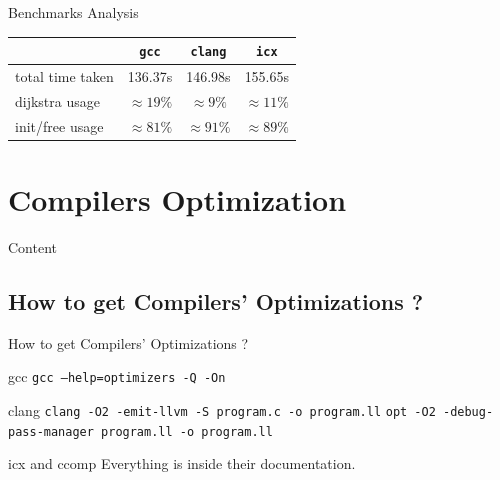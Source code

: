 \documentclass{beamer}
\newcommand{\gcc}{\texttt{gcc} }
\newcommand{\icx}{\texttt{icx} }
\newcommand{\clang}{\texttt{clang} }
\begin{document}
    \begin{frame}{Benchmarks Analysis}
        \begin{block}{}
            \begin{table}[H]
            \centering
            \begin{tabular}{|l|c|c|c|}
            \hline
            & \gcc & \clang & \icx \\
            \hline
            total time taken & 136.37s       & 146.98s       & 155.65s \\
            dijkstra usage   & $\approx19\%$ & $\approx9\%$  & $\approx11\%$    \\
            init/free usage  & $\approx81\%$ & $\approx91\%$ & $\approx89\%$   \\
            \hline
            \end{tabular}
            \end{table}
        \end{block}
    \end{frame}
    
    \section{Compilers Optimization}
    \begin{frame}[noframenumbering]{Content}
        \tableofcontents[currentsection]
    \end{frame}
    
    \subsection{How to get Compilers' Optimizations ?}
    \begin{frame}[fragile]{How to get Compilers' Optimizations ?}
        \begin{block}{gcc}
            \texttt{gcc --help=optimizers -Q -On}
        \end{block}
        \begin{block}{clang}
            \texttt{clang -O2 -emit-llvm -S program.c -o program.ll} \newline
            \texttt{opt -O2 -debug-pass-manager program.ll -o program.ll}
        \end{block}
        \begin{block}{icx and ccomp}
            Everything is inside their documentation.
        \end{block}
    \end{frame}
    
\end{document}
